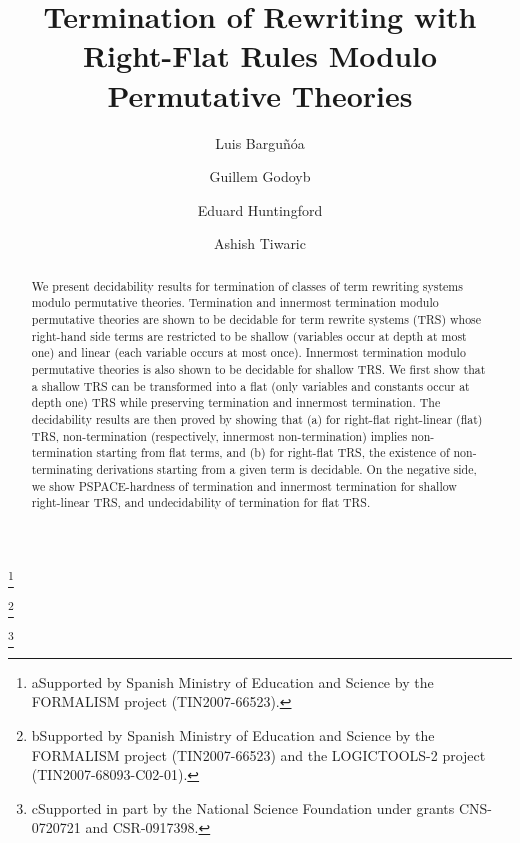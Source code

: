 \documentclass{LMCS}
\theoremstyle{plain}
\begin{document}
\title[Termination of Rewriting]{Termination of Rewriting with Right-Flat Rules Modulo Permutative Theories\rsuper*}

\author[L.~Bargu\~n\'o]{Luis Bargu\~n\'o\rsuper a}	\address{{}Universitat Polit\`ecnica de Catalunya, Jordi Girona 1, Barcelona, Spain}
  \thanks{{\lsuper a}Supported by Spanish Ministry of Education and Science by the
FORMALISM project (TIN2007-66523).}

\author[G.~Godoy]{Guillem Godoy\rsuper b}	\address{ pt}
\thanks{{\lsuper b}Supported by Spanish Ministry of Education and Science by the
FORMALISM project (TIN2007-66523) and the
LOGICTOOLS-2 project (TIN2007-68093-C02-01).}

\author[E.~Huntingford]{Eduard Huntingford}	\address{ pt}


\author[A.~Tiwari]{Ashish Tiwari\rsuper c}	\address{{\lsuper c}SRI International, Menlo Park, CA 94205}	  \thanks{{\lsuper c}Supported in part by the National Science Foundation under grants
CNS-0720721 and CSR-0917398.}	









\begin{abstract}
\noindent 
We present decidability results for termination of classes
of term rewriting systems modulo permutative theories.
Termination and innermost termination modulo permutative theories
are shown to be decidable for term rewrite systems (TRS) whose right-hand
side terms are restricted to be shallow (variables
occur at depth at most one) and linear (each variable occurs at most once).
Innermost termination modulo permutative theories is also shown to be decidable
for shallow TRS. 
We first show that a shallow TRS can be transformed
into a flat (only variables and constants occur at depth one) 
TRS while preserving termination and innermost
termination.
The decidability results are then proved by showing that 
(a) for right-flat right-linear (flat) TRS, 
non-termination (respectively, innermost non-termination) implies
non-termination starting from flat terms, and
(b) for right-flat TRS,
the existence of non-terminating derivations
starting from a given term is decidable.
On the negative side, we show PSPACE-hardness of termination and innermost
termination for shallow right-linear TRS,
and undecidability of termination
for flat TRS.\end{abstract}
\end{document}
